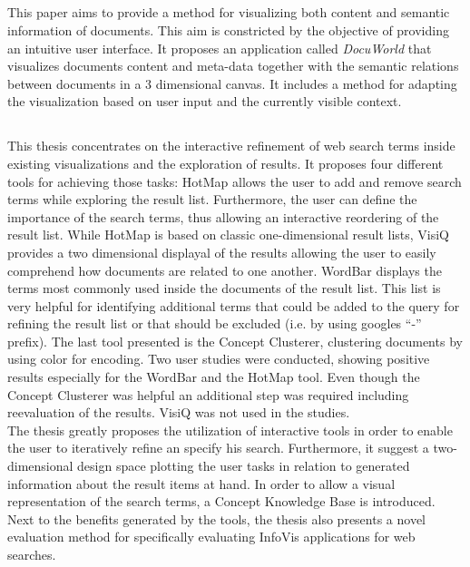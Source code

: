\subsection{\cite{Einsfeld2006}}
This paper aims to provide a method for visualizing both content and semantic information of documents. This aim is constricted by the objective of providing an intuitive user interface. It proposes an application called \emph{DocuWorld} that visualizes documents content and meta-data together with the semantic relations between documents in a 3 dimensional canvas. It includes a method for adapting the visualization based on user input and the currently visible context.

\subsection{\cite{Hoeber2007}}
This thesis concentrates on the interactive refinement of web search terms inside existing visualizations and the exploration of results. It proposes four different tools for achieving those tasks: HotMap allows the user to add and remove search terms while exploring the result list. Furthermore, the user can define the importance of the search terms, thus allowing an interactive reordering of the result list. While HotMap is based on classic one-dimensional result lists, VisiQ provides a two dimensional displayal of the results allowing the user to easily comprehend how documents are related to one another. WordBar displays the terms most commonly used inside the documents of the result list. This list is very helpful for identifying additional terms that could be added to the query for refining the result list or that should be excluded (i.e. by using googles ``-'' prefix). The last tool presented is the Concept Clusterer, clustering documents by using color for encoding. Two user studies were conducted, showing positive results especially for the WordBar and the HotMap tool. Even though the Concept Clusterer was helpful an additional step was required including reevaluation of the results. VisiQ was not used in the studies. \\
The thesis greatly proposes the utilization of interactive tools in order to enable the user to iteratively refine an specify his search. Furthermore, it suggest a two-dimensional design space plotting the user tasks in relation to generated information about the result items at hand. In order to allow a visual representation of the search terms, a Concept Knowledge Base is introduced. Next to the benefits generated by the tools, the thesis also presents a novel evaluation method for specifically evaluating InfoVis applications for web searches.

